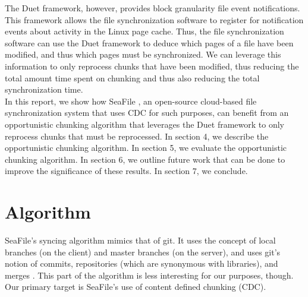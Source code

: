 \documentclass[table]{article}
\begin{document}
\begin{multicols}{2}
The Duet framework\cite{duet}, however, provides block granularity file event notifications. This framework allows the file synchronization software to register for notification events about activity in the Linux page cache. Thus, the file synchronization software can use the Duet framework to deduce which pages of a file have been modified, and thus which pages must be synchronized. We can leverage this information to only reprocess chunks that have been modified, thus reducing the total amount time spent on chunking and thus also reducing the total synchronization time.\\

In this report, we show how SeaFile \cite{SeaFile}, an open-source cloud-based file synchronization system that uses CDC for such purposes, can benefit from an opportunistic chunking algorithm that leverages the Duet framework to only reprocess chunks that must be reprocessed. In section 4, we describe the opportunistic chunking algorithm. In section 5, we evaluate the opportunistic chunking algorithm. In section 6, we outline future work that can be done to improve the significance of these results. In section 7, we conclude.\\

\section{Algorithm}

SeaFile's syncing algorithm mimics that of git. It uses the concept of local branches (on the client) and master branches (on the server), and uses git's notion of commits, repositories (which are synonymous with libraries), and merges \cite{SeaFile-sync-algo}. This part of the algorithm is less interesting for our purposes, though. Our primary target is SeaFile's use of content defined chunking (CDC).\\


\end{multicols}
\end{document}
